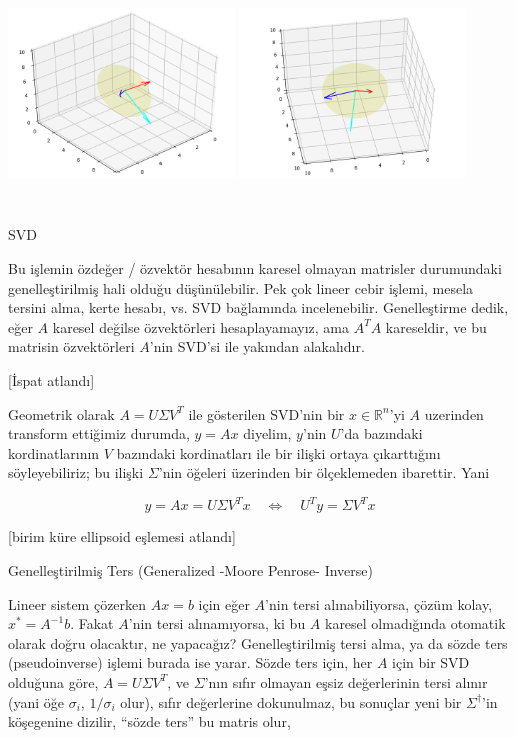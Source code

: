 \documentclass[12pt,fleqn]{article}\usepackage{../../common}
\begin{document}
\includegraphics[height=6cm,width=6cm]{vision_02_03.png}
\includegraphics[height=6cm,width=6cm]{vision_02_04.png}

SVD 

Bu işlemin özdeğer / özvektör hesabının karesel olmayan matrisler
durumundaki genelleştirilmiş hali olduğu düşünülebilir. Pek çok lineer
cebir işlemi, mesela tersini alma, kerte hesabı, vs. SVD bağlamında
incelenebilir. Genelleştirme dedik, eğer $A$ karesel değilse özvektörleri
hesaplayamayız, ama $A^TA$ kareseldir, ve bu matrisin özvektörleri $A$'nin
SVD'si ile yakından alakalıdır.

[İspat atlandı]

Geometrik olarak $A = U \Sigma V^T$ ile gösterilen SVD'nin bir $x \in
\mathbb{R}^n$'yi $A$ uzerinden transform ettiğimiz durumda, $y = Ax$
diyelim, $y$'nin $U$'da bazındaki kordinatlarının $V$ bazındaki
kordinatları ile bir ilişki ortaya çıkarttığını söyleyebiliriz; bu ilişki
$\Sigma$'nin öğeleri üzerinden bir ölçeklemeden ibarettir. Yani

$$ y = Ax = U\Sigma V^Tx 
\quad \Leftrightarrow \quad
U^Ty = \Sigma V^T x
$$

[birim küre ellipsoid eşlemesi atlandı]

Genelleştirilmiş Ters (Generalized -Moore Penrose- Inverse)

Lineer sistem çözerken $Ax = b$ için eğer $A$'nin tersi alınabiliyorsa,
çözüm kolay, $x^* = A^{-1}b$. Fakat $A$'nin tersi alınamıyorsa, ki bu $A$
karesel olmadığında otomatik olarak doğru olacaktır, ne yapacağız?
Genelleştirilmiş tersi alma, ya da sözde ters (pseudoinverse) işlemi burada
ise yarar. Sözde ters için, her $A$ için bir SVD olduğuna göre, $A = U
\Sigma V^T$, ve $\Sigma$'nın sıfır olmayan eşsiz değerlerinin tersi alınır (yani 
öğe $\sigma_i$, $1/\sigma_i$ olur), sıfır değerlerine dokunulmaz, bu sonuçlar yeni 
bir $\Sigma^{\dagger}$'in köşegenine dizilir, ``sözde ters'' bu matris olur,
\end{document}
